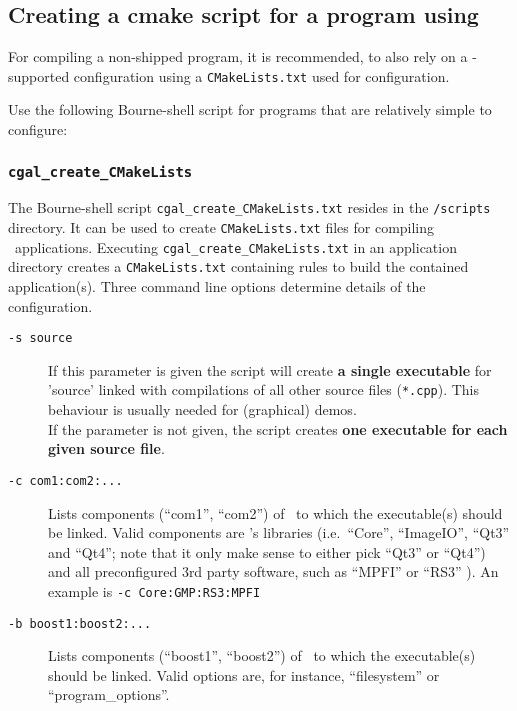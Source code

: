 \subsection{Creating a cmake script for a program using \cgal}

For compiling a non-shipped program, it is
recommended, to also rely on a \cmake-supported configuration using a
\texttt{CMakeLists.txt} used for configuration. 

Use the following Bourne-shell script for programs that are relatively
simple to configure:

\subsubsection{\texttt{cgal\_create\_CMakeLists\label{sec:create_cgal_CMakeLists}}}

The Bourne-shell script \texttt{cgal\_create\_CMakeLists.txt} resides in the
\texttt{\cgalrel/scripts} directory. It can be used to create
\texttt{CMakeLists.txt} files for compiling \cgal\ applications. Executing
\texttt{cgal\_create\_CMakeLists.txt} in an application directory creates a
\texttt{CMakeLists.txt} containing rules to build the contained
application(s). Three command line options determine details of the
configuration.

\begin{description}
\item [\texttt{-s source}] If this parameter is given the script will
  create \textbf{a single executable} for 'source' linked with
  compilations of all other source files (\texttt{*.cpp}). This
  behaviour is usually needed for (graphical) demos. \\
  If the parameter is not given, the script creates \textbf{one executable for each given
  source file}.
\item [\texttt{-c com1:com2:...}] Lists components (``com1'',
  ``com2'') of \cgal\ to which the executable(s) should be linked. Valid components are \cgal's
  libraries (i.e.~``Core'', ``ImageIO'', ``Qt3'' and ``Qt4''; note
  that it only make sense to either pick ``Qt3'' or ``Qt4'') and all
  preconfigured 3rd party software, such as ``MPFI'' or ``RS3''
  ). An example is \texttt{-c Core:GMP:RS3:MPFI}

\item [\texttt{-b boost1:boost2:...}] Lists components (``boost1'',
  ``boost2'') of \boost\ to which the executable(s) should be
  linked. Valid options are, for instance, ``filesystem'' or ``program\_options''.

\end{description}

